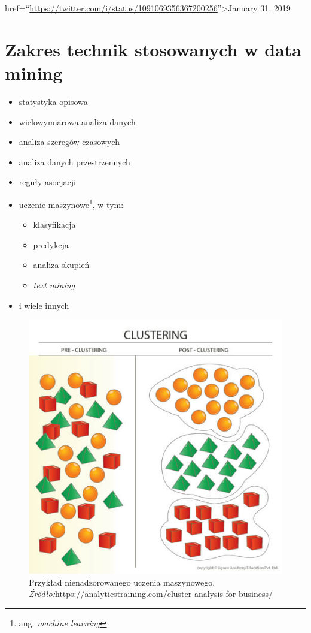 \documentclass[]{book}
\providecommand{\tightlist}{%
  \setlength{\itemsep}{0pt}\setlength{\parskip}{0pt}}
\let\rmarkdownfootnote\footnote%
\def\footnote{\protect\rmarkdownfootnote}
\theoremstyle{plain}
\theoremstyle{definition}
\begin{document}
href=``\url{https://twitter.com/i/status/1091069356367200256}''\textgreater{}January 31, 2019

\hypertarget{zakres-technik-stosowanych-w-data-mining}{%
\section*{Zakres technik stosowanych w data mining}\label{zakres-technik-stosowanych-w-data-mining}}

\begin{itemize}
\tightlist
\item
  statystyka opisowa
\item
  wielowymiarowa analiza danych
\item
  analiza szeregów czasowych
\item
  analiza danych przestrzennych
\item
  reguły asocjacji
\item
  uczenie maszynowe\footnote{ang. \emph{machine learning}}, w tym:

  \begin{itemize}
  \tightlist
  \item
    klasyfikacja
  \item
    predykcja
  \item
    analiza skupień
  \item
    \emph{text mining}
  \end{itemize}
\item
  i wiele innych
\end{itemize}

\begin{figure}
\centering
\includegraphics{images/cluster1.jpg}
\caption{\label{fig:cluster1}Przykład nienadzorowanego uczenia maszynowego.~ \emph{Źródło:}\url{https://analyticstraining.com/cluster-analysis-for-business/}}
\end{figure}
\end{document}
